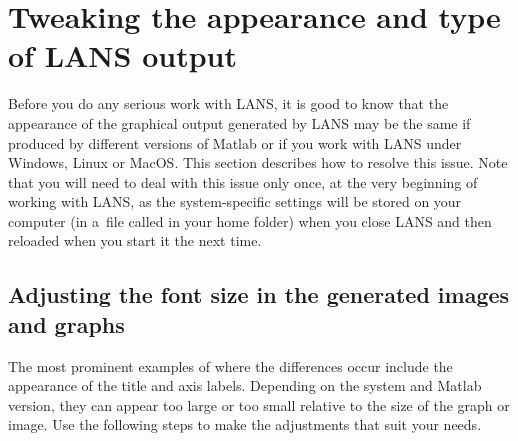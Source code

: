 \section{Tweaking the appearance and type of LANS output}
\label{sec:appearance}

\purplebox{}
Before you do any serious work with LANS, it is good to know that the appearance of the graphical output generated by LANS may  be the same if produced by different versions of Matlab or if you work with LANS under Windows, Linux or MacOS. This section describes how to resolve this issue. Note that you will need to deal with this issue only once, at the very beginning of working with LANS, as the system-specific settings will be stored on your computer (in a~file called  in your home folder) when you close LANS and then reloaded when you start it the next time. 
\tcbe

\subsection{Adjusting the font size in the generated images and graphs}
\setcounter{step}{0}

\goldbox{}
The most prominent examples of where the differences occur include the appearance of the title and axis labels. Depending on the system and Matlab version, they can appear too large or too small relative to the size of the graph or image. Use the following steps to make the adjustments that suit your needs. 
\tcbe







